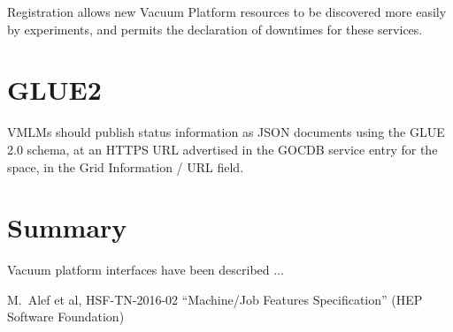 \documentclass[12pt,a4paper]{article}
\begin{document}
Registration allows new Vacuum Platform resources to be discovered more easily
by experiments, and permits the declaration of downtimes for these services.

\section{GLUE2}
\label{sec:glue2}

VMLMs should publish status information as JSON documents using the GLUE 2.0 
schema, at an HTTPS URL advertised in the GOCDB service entry for the space,
in the Grid Information / URL field.

\clearpage

\section{Summary}
\label{sec:Summary}

Vacuum platform interfaces have been described ...



\begin{thebibliography}{9}


 M.~Alef et al, HSF-TN-2016-02 ``Machine/Job Features Specification'' (HEP Software Foundation)

\end{thebibliography}


\end{document}
